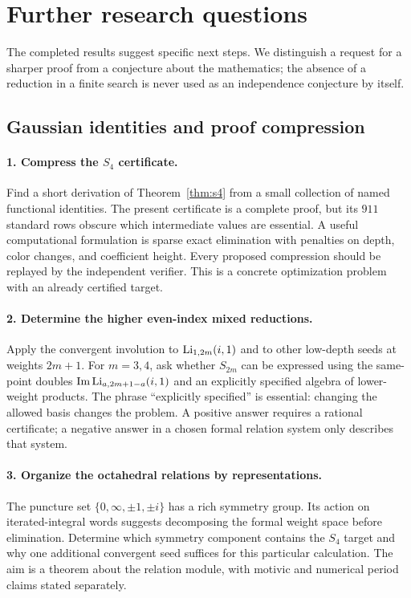 \section{Further research questions}
\label{sec:research}

The completed results suggest specific next steps. We distinguish a
request for a sharper proof from a conjecture about the mathematics;
the absence of a reduction in a finite search is never used as an
independence conjecture by itself.

\subsection{Gaussian identities and proof compression}

\paragraph{1. Compress the $S_4$ certificate.}
Find a short derivation of Theorem~\ref{thm:s4} from a small collection
of named functional identities. The present certificate is a complete
proof, but its $911$ standard rows obscure which intermediate values
are essential. A useful computational formulation is sparse exact
elimination with penalties on depth, color changes, and coefficient
height. Every proposed compression should be replayed by the independent
verifier. This is a concrete optimization problem with an already
certified target.

\paragraph{2. Determine the higher even-index mixed reductions.}
Apply the convergent involution to
$\operatorname{Li}_{1,2m}(i,1)$ and to other low-depth seeds at weights $2m+1$.
For $m=3,4$, ask whether $S_{2m}$ can be expressed using the same-point
doubles $\operatorname{Im}\operatorname{Li}_{a,2m+1-a}(i,1)$ and an explicitly
specified algebra of lower-weight products. The phrase ``explicitly
specified'' is essential: changing the allowed basis changes the
problem. A positive answer requires a rational certificate; a negative
answer in a chosen formal relation system only describes that system.

\paragraph{3. Organize the octahedral relations by representations.}
The puncture set $\{0,\infty,\pm1,\pm i\}$ has a rich symmetry group.
Its action on iterated-integral words suggests decomposing the formal
weight space before elimination. Determine which symmetry component
contains the $S_4$ target and why one additional convergent seed suffices
for this particular calculation. The aim is a theorem about the relation
module, with motivic and numerical period claims stated separately.

